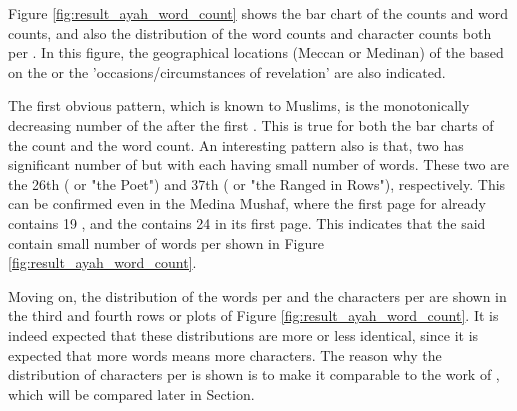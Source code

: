 Figure \ref{fig:result_ayah_word_count} shows the bar chart of the   counts and word counts, and also the distribution of the word counts and character counts both per  . In this figure, the geographical locations (Meccan or Medinan) of the   based on the   or the 'occasions/circumstances of revelation' are also indicated.

The first obvious pattern, which is known to Muslims, is the monotonically decreasing number of the   after the first  . This is true for both the bar charts of the   count and the word count. An interesting pattern also is that, two   has significant number of   but with each   having small number of words. These two   are the   26th (  or "the Poet") and 37th (  or "the Ranged in Rows"), respectively. This can be confirmed even in the Medina Mushaf, where the first page for   already contains 19  , and the   contains 24   in its first page. This indicates that the said   contain small number of words per   shown in Figure \ref{fig:result_ayah_word_count}.

Moving on, the distribution of the words per   and the characters per   are shown in the third and fourth rows or plots of Figure \ref{fig:result_ayah_word_count}. It is indeed expected that these distributions are more or less identical, since it is expected that more words means more characters. The reason why the distribution of characters per   is shown is to make it comparable to the work of , which will be compared later in Section. 

